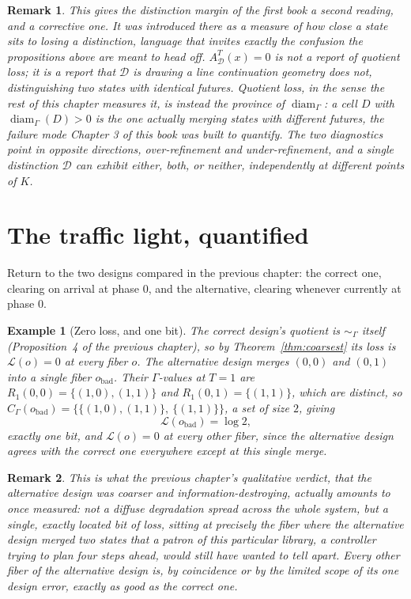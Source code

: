 \documentclass[11pt]{report}
\newtheorem{remark}{Remark}[chapter]
\newtheorem{example}{Example}[chapter]
\begin{document}
\begin{remark}
This gives the distinction margin of the first book a second reading,
and a corrective one. It was introduced there as a measure of how
close a state sits to losing a distinction, language that invites
exactly the confusion the propositions above are meant to head off.
$A_{\mathcal D}^T(x) = 0$ is not a report of quotient loss; it is a
report that $\mathcal{D}$ is drawing a line continuation geometry
does not, distinguishing two states with identical futures. Quotient
loss, in the sense the rest of this chapter measures it, is instead
the province of $\operatorname{diam}_\Gamma$: a cell $D$ with
$\operatorname{diam}_\Gamma(D) > 0$ is the one actually merging states
with different futures, the failure mode Chapter 3 of this book was
built to quantify. The two diagnostics point in opposite directions,
over-refinement and under-refinement, and a single distinction
$\mathcal{D}$ can exhibit either, both, or neither, independently at
different points of $K$.
\end{remark}

\section*{The traffic light, quantified}

Return to the two designs compared in the previous chapter: the
correct one, clearing on arrival at phase $0$, and the alternative,
clearing whenever currently at phase $0$.

\begin{example}[Zero loss, and one bit]
The correct design's quotient is $\sim_\Gamma$ itself (Proposition~4
of the previous chapter), so by Theorem~\ref{thm:coarsest} its loss is
$\mathcal{L}(o) = 0$ at every fiber $o$. The alternative design merges
$(0,0)$ and $(0,1)$ into a single fiber $o_{\mathrm{bad}}$. Their
$\Gamma$-values at $T=1$ are $R_1(0,0) = \{(1,0),(1,1)\}$ and
$R_1(0,1) = \{(1,1)\}$, which are distinct, so
$C_\Gamma(o_{\mathrm{bad}}) = \{\{(1,0),(1,1)\},\ \{(1,1)\}\}$, a set
of size $2$, giving
\[
\mathcal{L}(o_{\mathrm{bad}}) = \log 2,
\]
exactly one bit, and $\mathcal{L}(o) = 0$ at every other fiber, since
the alternative design agrees with the correct one everywhere except
at this single merge.
\end{example}

\begin{remark}
This is what the previous chapter's qualitative verdict, that the
alternative design was coarser and information-destroying, actually
amounts to once measured: not a diffuse degradation spread across the
whole system, but a single, exactly located bit of loss, sitting at
precisely the fiber where the alternative design merged two states
that a patron of this particular library, a controller trying to
plan four steps ahead, would still have wanted to tell apart. Every
other fiber of the alternative design is, by coincidence or by the
limited scope of its one design error, exactly as good as the correct
one.
\end{remark}
\end{document}
